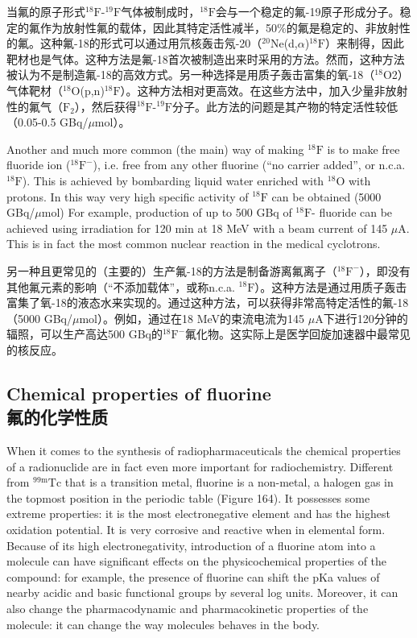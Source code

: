 \documentclass[dvipsnames, svgnames,a4paper,11pt]{article}
\begin{document}
当氟的原子形式${}^\mathrm{18}\mathrm{F}$-${}^\mathrm{19}\mathrm{F}$气体被制成时，${}^\mathrm{18}\mathrm{F}$会与一个稳定的氟-19原子形成分子。稳定的氟作为放射性氟的载体，因此其特定活性减半，50\%的氟是稳定的、非放射性的氟。这种氟-18的形式可以通过用氘核轰击氖-20（${}^\mathrm{20}\mathrm{Ne}$(d,$\alpha$)${}^\mathrm{18}\mathrm{F}$）来制得，因此靶材也是气体。这种方法是氟-18首次被制造出来时采用的方法。然而，这种方法被认为不是制造氟-18的高效方式。另一种选择是用质子轰击富集的氧-18（${}^\mathrm{18}\mathrm{O}$2）气体靶材（${}^\mathrm{18}\mathrm{O}$(p,n)${}^\mathrm{18}\mathrm{F}$）。这种方法相对更高效。在这些方法中，加入少量非放射性的氟气（$\mathrm{F}_2$），然后获得${}^\mathrm{18}\mathrm{F}$-${}^\mathrm{19}\mathrm{F}$分子。此方法的问题是其产物的特定活性较低（0.05-0.5 GBq/$\mu$mol）。

Another and much more common (the main) way of making ${}^\mathrm{18}\mathrm{F}$ is to make free
fluoride ion (${}^\mathrm{18}\mathrm{F}^-$), i.e. free from any other fluorine (“no carrier added”, or n.c.a. ${}^\mathrm{18}\mathrm{F}$).
This is achieved by bombarding liquid water enriched with ${}^\mathrm{18}\mathrm{O}$ with protons. In this
way very high specific activity of ${}^\mathrm{18}\mathrm{F}$ can be obtained (5000 GBq/$\mu$mol) For example,
production of up to 500 GBq of ${}^\mathrm{18}\mathrm{F}$- fluoride can be achieved using irradiation for 120
min at 18 MeV with a beam current of 145 $\mu$A. This is in fact the most common
nuclear reaction in the medical cyclotrons.


另一种且更常见的（主要的）生产氟-18的方法是制备游离氟离子（${}^\mathrm{18}\mathrm{F}^-$），即没有其他氟元素的影响（“不添加载体”，或称n.c.a. ${}^\mathrm{18}\mathrm{F}$）。这种方法是通过用质子轰击富集了氧-18的液态水来实现的。通过这种方法，可以获得非常高特定活性的氟-18（5000 GBq/$\mu$mol）。例如，通过在18 MeV的束流电流为145 $\mu$A下进行120分钟的辐照，可以生产高达500 GBq的${}^\mathrm{18}\mathrm{F}^-$氟化物。这实际上是医学回旋加速器中最常见的核反应。

\subsection{Chemical properties of fluorine \\氟的化学性质}
When it comes to the synthesis of radiopharmaceuticals the chemical properties of a
radionuclide are in fact even more important for radiochemistry. Different from \(\mathrm{{}^{99m}Tc}\)
that is a transition metal, fluorine is a non-metal, a halogen gas in the topmost
position in the periodic table (Figure 164). It possesses some extreme properties: it
is the most electronegative element and has the highest oxidation potential. It is very
corrosive and reactive when in elemental form. Because of its high electronegativity,
introduction of a fluorine atom into a molecule can have significant effects on the
physicochemical properties of the compound: for example, the presence of fluorine
can shift the pKa values of nearby acidic and basic functional groups by several log
units. Moreover, it can also change the pharmacodynamic and pharmacokinetic
properties of the molecule: it can change the way molecules behaves in the body.
\end{document}

